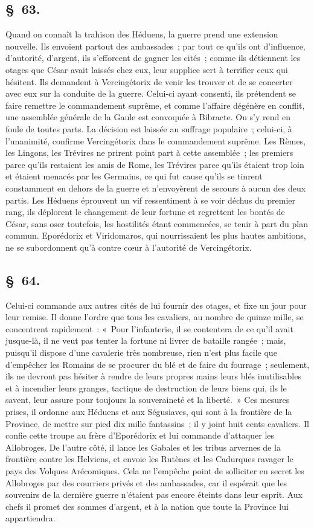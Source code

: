 \documentclass[french,twoside]{book} %
\begin{document}
\subsection[{§ 63.}]{ \textsc{§ 63.} }
\noindent Quand on connaît la trahison des Héduens, la guerre prend une extension nouvelle. Ils envoient partout des ambassades ; par tout ce qu’ils ont d’influence, d’autorité, d’argent, ils s’efforcent de gagner les cités ; comme ils détiennent les otages que César avait laissés chez eux, leur supplice sert à terrifier ceux qui hésitent. Ils demandent à Vercingétorix de venir les trouver et de se concerter avec eux sur la conduite de la guerre. Celui-ci ayant consenti, ils prétendent se faire remettre le commandement suprême, et comme l’affaire dégénère en conflit, une assemblée générale de la Gaule est convoquée à Bibracte. On s’y rend en foule de toutes parts. La décision est laissée au suffrage populaire ; celui-ci, à l’unanimité, confirme Vercingétorix dans le commandement suprême. Les Rèmes, les Lingons, les Trévires ne prirent point part à cette assemblée ; les premiers parce qu’ils restaient les amis de Rome, les Trévires parce qu’ils étaient trop loin et étaient menacés par les Germains, ce qui fut cause qu’ils se tinrent constamment en dehors de la guerre et n’envoyèrent de secours à aucun des deux partis. Les Héduens éprouvent un vif ressentiment à se voir déchus du premier rang, ils déplorent le changement de leur fortune et regrettent les bontés de César, sans oser toutefois, les hostilités étant commencées, se tenir à part du plan commun. Eporédorix et Viridomaros, qui nourrissaient les plus hautes ambitions, ne se subordonnent qu’à contre cœur à l’autorité de Vercingétorix.
\subsection[{§ 64.}]{ \textsc{§ 64.} }
\noindent Celui-ci commande aux autres cités de lui fournir des otages, et fixe un jour pour leur remise. Il donne l’ordre que tous les cavaliers, au nombre de quinze mille, se concentrent rapidement : « Pour l’infanterie, il se contentera de ce qu’il avait jusque-là, il ne veut pas tenter la fortune ni livrer de bataille rangée ; mais, puisqu’il dispose d’une cavalerie très nombreuse, rien n’est plus facile que d’empêcher les Romains de se procurer du blé et de faire du fourrage ; seulement, ils ne devront pas hésiter à rendre de leurs propres mains leurs blés inutilisables et à incendier leurs granges, tactique de destruction de leurs biens qui, ils le savent, leur assure pour toujours la souveraineté et la liberté. » Ces mesures prises, il ordonne aux Héduens et aux Ségusiaves, qui sont à la frontière de la Province, de mettre sur pied dix mille fantassins ; il y joint huit cents cavaliers. Il confie cette troupe au frère d’Eporédorix et lui commande d’attaquer les Allobroges. De l’autre côté, il lance les Gabales et les tribus arvernes de la frontière contre les Helviens, et envoie les Rutènes et les Cadurques ravager le pays des Volques Arécomiques. Cela ne l’empêche point de solliciter en secret les Allobroges par des courriers privés et des ambassades, car il espérait que les souvenirs de la dernière guerre n’étaient pas encore éteints dans leur esprit. Aux chefs il promet des sommes d’argent, et à la nation que toute la Province lui appartiendra.
\end{document}
